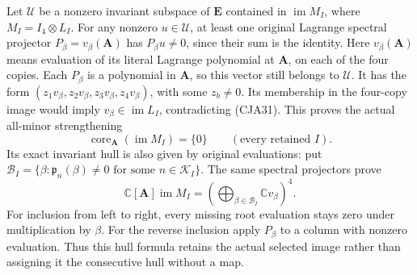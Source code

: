 \documentclass[11pt,a4paper]{article}
\begin{document}
Let \(\mathcal U\) be a nonzero invariant subspace of
\(\mathbf E\) contained in \(\operatorname{im}M_I\), where
\(M_I=I_4\otimes L_I\).
For any nonzero \(u\in\mathcal U\), at least one original Lagrange
spectral projector \(P_\beta=v_\beta(\mathbf A)\) has
\(P_\beta u\ne0\), since their sum is the identity.
Here \(v_\beta(\mathbf A)\) means evaluation of its literal
Lagrange polynomial at \(\mathbf A\), on each of the four copies.
Each \(P_\beta\) is a polynomial in \(\mathbf A\), so this vector
still belongs to \(\mathcal U\).
It has the form
\((z_1v_\beta,z_2v_\beta,z_3v_\beta,z_4v_\beta)\), with some
\(z_b\ne0\).
Its membership in the four-copy image would imply
\(v_\beta\in\operatorname{im}L_I\), contradicting (CJA31).
This proves the actual all-minor strengthening
\begin{equation}
 \boxed{\operatorname{core}_{\mathbf A}(\operatorname{im}M_I)
             =\{0\}\qquad(\text{every retained }I).}
 \tag{CJA32}
\end{equation}
Its exact invariant hull is also given by original evaluations:
put
\(\mathcal B_I=\{\beta:\mathfrak p_n(\beta)\ne0
\text{ for some }n\in\mathcal K_I\}\).
The same spectral projectors prove
\[
 \mathbb C[\mathbf A]\operatorname{im}M_I
   =\left(\bigoplus_{\beta\in\mathcal B_I}
                       \mathbb Cv_\beta\right)^4 .
 \]
For inclusion from left to right, every missing root evaluation
stays zero under multiplication by \(\beta\).
For the reverse inclusion apply \(P_\beta\) to a column with nonzero
evaluation.  Thus this hull formula retains the actual selected
image rather than assigning it the consecutive hull without a map.
\end{document}
